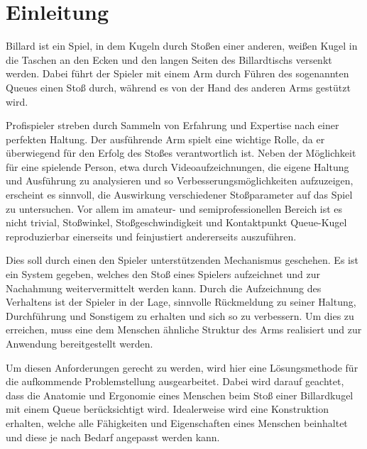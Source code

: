 \chapter{Einleitung}
	Billard ist ein Spiel, in dem Kugeln durch Stoßen einer anderen, weißen Kugel in die Taschen an den Ecken und den langen Seiten des Billardtischs versenkt werden.
	Dabei führt der Spieler mit einem Arm durch Führen des sogenannten Queues einen Stoß durch, während es von der Hand des anderen Arms gestützt wird.\par\medskip
	Profispieler streben durch Sammeln von Erfahrung und Expertise nach einer perfekten Haltung.
	Der ausführende Arm spielt eine wichtige Rolle, da er überwiegend für den Erfolg des Stoßes verantwortlich ist.
	Neben der Möglichkeit für eine spielende Person, etwa durch Videoaufzeichnungen, die eigene Haltung und Ausführung zu analysieren und so Verbesserungsmöglichkeiten aufzuzeigen, erscheint es sinnvoll, die Auswirkung verschiedener Stoßparameter auf das Spiel zu untersuchen.
	Vor allem im amateur- und semiprofessionellen Bereich ist es nicht trivial, Stoßwinkel, Stoßgeschwindigkeit und Kontaktpunkt Queue-Kugel reproduzierbar einerseits und feinjustiert andererseits auszuführen.\par\medskip
	Dies soll durch einen den Spieler unterstützenden Mechanismus geschehen.
	Es ist ein System gegeben, welches den Stoß eines Spielers aufzeichnet und zur Nachahmung weitervermittelt werden kann.
	Durch die Aufzeichnung des Verhaltens ist der Spieler in der Lage, sinnvolle Rückmeldung zu seiner Haltung, Durchführung und Sonstigem zu erhalten und sich so zu verbessern.
	Um dies zu erreichen, muss eine dem Menschen ähnliche Struktur des Arms realisiert und zur Anwendung bereitgestellt werden.\par
	Um diesen Anforderungen gerecht zu werden, wird hier eine Lösungsmethode für die aufkommende Problemstellung ausgearbeitet.
	Dabei wird darauf geachtet, dass die Anatomie und Ergonomie eines Menschen beim Stoß einer Billardkugel mit einem Queue berücksichtigt wird.
	Idealerweise wird eine Konstruktion erhalten, welche alle Fähigkeiten und Eigenschaften eines Menschen beinhaltet und diese je nach Bedarf angepasst werden kann.
